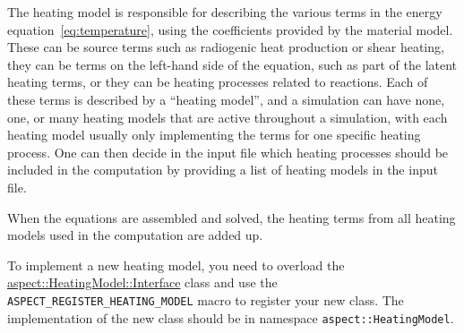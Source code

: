 \documentclass{article}
\begin{document}
  The heating model is responsible for describing the various
terms in the energy equation~\eqref{eq:temperature}, using the
coefficients provided by the material model.  These can be source
terms such as radiogenic heat production or shear heating, they can be
terms on the left-hand side of the equation, such as part of the
latent heating terms, or they can be heating processes related to
reactions. Each of these terms is described by a ``heating model'',
and a simulation can have none, one, or many heating models that are
active throughout a simulation, with each heating model usually only
implementing the terms for one specific heating process. One can then
decide in the input file which heating processes should be included in
the computation by providing a list of heating models in the input
file.

When the equations are assembled and solved, the heating terms from all heating models
used in the computation are added up.

To implement a new heating model, you need to overload the
\href{doc/doxygen/classaspect_1_1HeatingModel_1_1Interface.html}{aspect::HeatingModel::Interface}
class and use
the \texttt{ASPECT\_REGISTER\_HEATING\_MODEL} macro to register your new
class. The implementation of the new class should be in namespace
\texttt{aspect::HeatingModel}.
\end{document}
